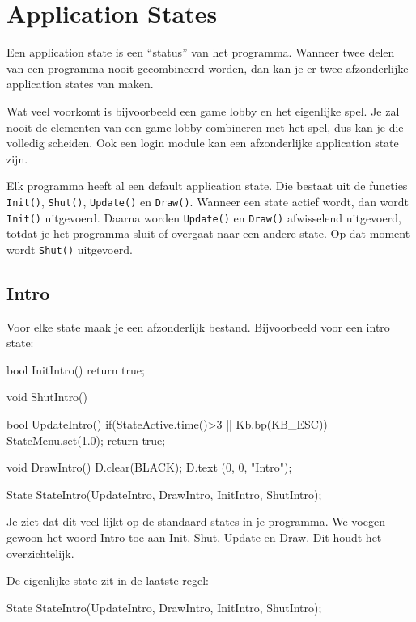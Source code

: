 \chapter{Application States}
\label{chapter:application_states}

Een application state is een ``status'' van het programma. Wanneer twee delen van een programma nooit gecombineerd worden, dan kan je er twee afzonderlijke application states van maken. 

Wat veel voorkomt is bijvoorbeeld een game lobby en het eigenlijke spel. Je zal nooit de elementen van een game lobby combineren met het spel, dus kan je die volledig scheiden. Ook een login module kan een afzonderlijke application state zijn.

Elk programma heeft al een default application state. Die bestaat uit de functies \texttt{Init()}, \texttt{Shut()}, \texttt{Update()} en \texttt{Draw()}. Wanneer een state actief wordt, dan wordt \texttt{Init()} uitgevoerd. Daarna worden \texttt{Update()} en \texttt{Draw()} afwisselend uitgevoerd, totdat je het programma sluit of overgaat naar een andere state. Op dat moment wordt \texttt{Shut()} uitgevoerd.

\section{Intro}
Voor elke state maak je een afzonderlijk bestand. Bijvoorbeeld voor een intro state:

\begin{code}
bool InitIntro() {return true;}

void ShutIntro() {}

bool UpdateIntro()
{
   if(StateActive.time()>3 || Kb.bp(KB_ESC)) {
      StateMenu.set(1.0);                    
   }
   return true;
}

void DrawIntro()
{
   D.clear(BLACK);
   D.text (0, 0, "Intro");
}

State StateIntro(UpdateIntro, DrawIntro, InitIntro, ShutIntro);
\end{code}

Je ziet dat dit veel lijkt op de standaard states in je programma. We voegen gewoon het woord Intro toe aan Init, Shut, Update en Draw. Dit houdt het overzichtelijk.

De eigenlijke state zit in de laatste regel:

\begin{code}
State StateIntro(UpdateIntro, DrawIntro, InitIntro, ShutIntro);
\end{code}

